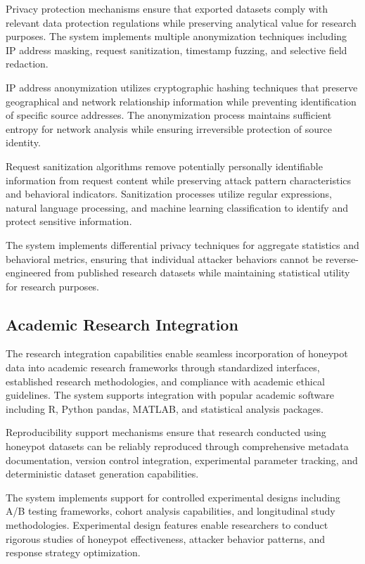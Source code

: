 Privacy protection mechanisms ensure that exported datasets comply with relevant data protection regulations while preserving analytical value for research purposes. The system implements multiple anonymization techniques including IP address masking, request sanitization, timestamp fuzzing, and selective field redaction.

IP address anonymization utilizes cryptographic hashing techniques that preserve geographical and network relationship information while preventing identification of specific source addresses. The anonymization process maintains sufficient entropy for network analysis while ensuring irreversible protection of source identity.

Request sanitization algorithms remove potentially personally identifiable information from request content while preserving attack pattern characteristics and behavioral indicators. Sanitization processes utilize regular expressions, natural language processing, and machine learning classification to identify and protect sensitive information.

The system implements differential privacy techniques for aggregate statistics and behavioral metrics, ensuring that individual attacker behaviors cannot be reverse-engineered from published research datasets while maintaining statistical utility for research purposes.

\subsection{Academic Research Integration}

The research integration capabilities enable seamless incorporation of honeypot data into academic research frameworks through standardized interfaces, established research methodologies, and compliance with academic ethical guidelines. The system supports integration with popular academic software including R, Python pandas, MATLAB, and statistical analysis packages.

Reproducibility support mechanisms ensure that research conducted using honeypot datasets can be reliably reproduced through comprehensive metadata documentation, version control integration, experimental parameter tracking, and deterministic dataset generation capabilities.

The system implements support for controlled experimental designs including A/B testing frameworks, cohort analysis capabilities, and longitudinal study methodologies. Experimental design features enable researchers to conduct rigorous studies of honeypot effectiveness, attacker behavior patterns, and response strategy optimization.

